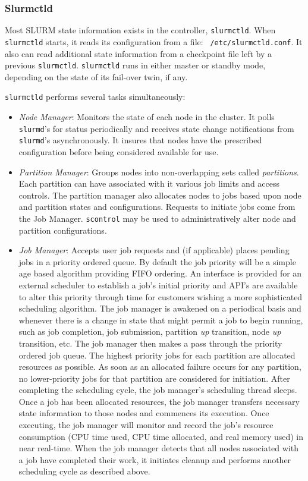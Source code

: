 \subsubsection{Slurmctld}

Most SLURM state information exists in the controller, {\tt slurmctld}.
When {\tt slurmctld} starts, it reads its configuration from a file: {\tt
/etc/slurmctld.conf}.  It also can read additional state information
from a checkpoint file left by a previous {\tt slurmctld}.
{\tt slurmctld} runs in either master or standby mode, depending on the
state of its fail-over twin, if any.

{\tt slurmctld} performs several tasks simultaneously:

\begin{itemize}
\item {\em Node Manager}: Monitors the state of each node in
the cluster.  It polls {\tt slurmd}'s for status periodically and
receives state change notifications from {\tt slurmd}'s asynchronously.
It insures that nodes have the prescribed configuration before being 
considered available for use.

\item {\em Partition Manager}: Groups nodes into non-overlapping sets called
{\em partitions}. Each partition can have associated with it various job
limits and access controls.  The partition manager also allocates nodes
to jobs based upon node and partition states and configurations. Requests
to initiate jobs come from the Job Manager.  {\tt scontrol} may be used
to administratively alter node and partition configurations.

\item {\em Job Manager}: Accepts user job requests and (if applicable)
places pending jobs in a priority ordered queue. By default the job
priority will be a simple age based algorithm providing FIFO ordering.
An interface is provided for an external scheduler to establish a job's
initial priority and API's are available to alter this priority through
time for customers wishing a more sophisticated scheduling algorithm.
The job manager is awakened on a periodical basis and whenever there
is a change in state that might permit a job to begin running, such
as job completion, job submission, partition {\em up} transition,
node {\em up} transition, etc.  The job manager then makes a pass
through the priority ordered job queue. The highest priority jobs 
for each partition are allocated resources as possible. As soon as an 
allocated failure occurs for any partition, no lower-priority jobs for 
that partition are considered for initiation. 
After completing the scheduling cycle, the job manager's scheduling
thread sleeps.  Once a job has been allocated resources, the job manager
transfers necessary state information to those nodes and commences
its execution.  Once executing, the job manager will monitor and record
the job's resource consumption (CPU time used, CPU time allocated, and
real memory used) in near real-time.  When the job manager detects that
all nodes associated with a job have completed their work, it initiates
cleanup and performs another scheduling cycle as described above.


\end{itemize}
